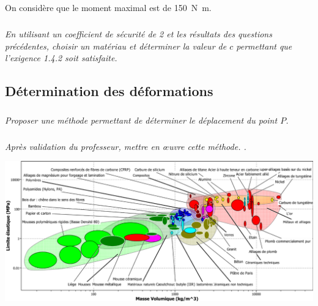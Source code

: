 \documentclass[10pt,fleqn]{article} %
\begin{document}
\begin{multicols}{2}
On considère que le moment maximal est de \SI{150}{N.m}. 
\subparagraph{}\textit{En utilisant un coefficient de sécurité de 2 et les résultats des questions précédentes, choisir un matériau et déterminer la valeur de $c$  permettant que l’exigence 1.4.2 soit satisfaite.}


\subsection*{Détermination des déformations}

\subparagraph{}\textit{Proposer une méthode permettant de déterminer le déplacement du point $P$.}

\subparagraph{}\textit{Après validation du professeur, mettre en \oe{}uvre cette méthode. .}
\end{multicols}


\begin{center}
\includegraphics[width=\linewidth]{images/fig_07}
\end{center}
\end{document}

